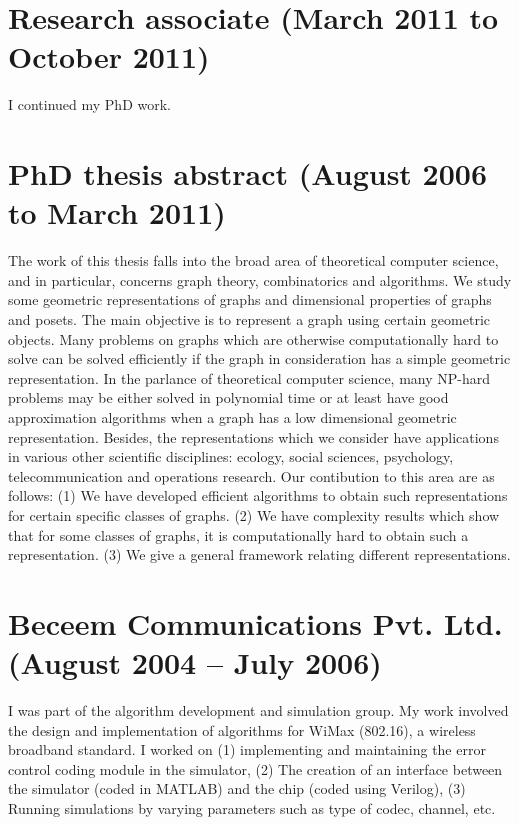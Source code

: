 \documentclass{article}
\begin{document}
\section{Research associate (March 2011 to October 2011)}
I continued my PhD work.

\section{PhD thesis abstract (August 2006 to March 2011)}
The work of this thesis falls into the broad area of theoretical computer
science, and in particular, concerns graph theory, combinatorics and
algorithms. We study some geometric representations of graphs and
dimensional properties of graphs and posets. The main objective is
to represent a graph using certain geometric objects. Many problems
on graphs which are otherwise computationally hard to solve can be
solved efficiently if the graph in consideration has a simple geometric
representation. In the parlance of theoretical computer science, many
NP-hard problems may be either solved in polynomial time or at least
have good approximation algorithms when a graph has a low dimensional
geometric representation. Besides, the representations which we consider
have applications in various other scientific disciplines: ecology,
social sciences, psychology, telecommunication and operations research.
Our contibution to this area are as follows:
(1) We have developed efficient algorithms to
obtain such representations for certain specific classes of graphs.
(2) We have complexity results which show that for some classes of graphs, it
is computationally hard to obtain such a representation.
(3) We give a general framework relating different representations.

\section{Beceem Communications Pvt. Ltd. (August 2004 -- July 2006)}\label{sec:beceem}
I was part of the algorithm development and simulation group. My
work involved the design and implementation of algorithms for WiMax
(802.16), a wireless broadband standard. I worked on (1) implementing
and maintaining the error control coding module in the simulator, 
(2) 
The creation of an interface between
the simulator (coded in MATLAB) and the chip (coded using Verilog), 
(3)
Running simulations by
varying parameters such as type of codec, channel, etc.
\end{document}
